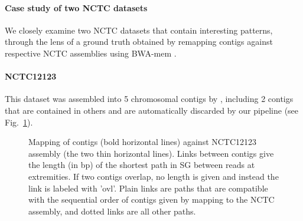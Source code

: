 \documentclass[./main.tex]{subfiles}
\newcommand{\modafterreview}[1]{#1}
\begin{document}


\paragraph{Case study of two NCTC datasets}

We closely examine two NCTC datasets that contain interesting patterns, through the lens of a ground truth obtained by remapping \canu contigs against respective NCTC assemblies using BWA-mem \citep{bwamem}.
%
% 



\paragraph{NCTC12123} 

This dataset was assembled into 5 chromosomal  contigs by \canu, including 2 contigs that are contained in others and are automatically discarded by our pipeline (see Fig.~\ref{fg:NCTC12123}). 
\begin{figure}[htbp]
    \centering
    \modafterreview{
	 
    }
    \caption{Mapping of \canu contigs (bold horizontal lines) against NCTC12123 assembly (the two thin horizontal lines). \modafterreview{Links between contigs give the length (in bp) of the shortest path in SG between reads at extremities. If two contigs overlap, no length is given and instead the link is labeled with 'ovl'}. 
    Plain links are paths that are compatible with the sequential order of contigs given  by mapping to the NCTC assembly, and dotted links are all other paths.}
    \label{fg:NCTC12123}
\end{figure}
\end{document}
